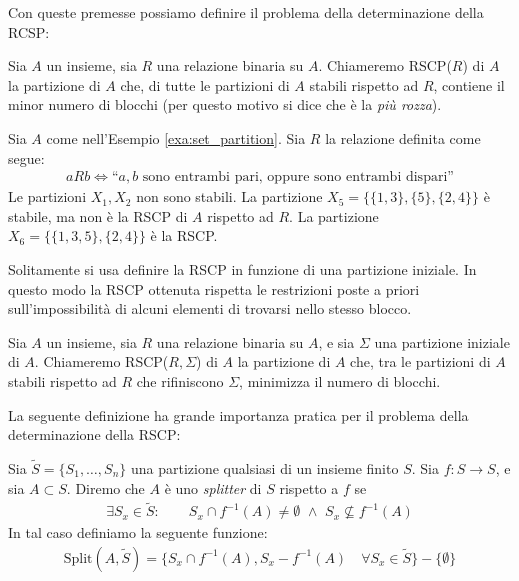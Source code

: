 Con queste premesse possiamo definire il problema della determinazione della RCSP:
\begin{definition}
    Sia $A$ un insieme, sia $R$ una relazione binaria su $A$. Chiameremo RSCP($R$) di $A$ la partizione di $A$ che, di tutte le partizioni di $A$ stabili rispetto ad $R$, contiene il minor numero di blocchi (per questo motivo si dice che è la \emph{più rozza}).
\end{definition}
\begin{example}
    Sia $A$ come nell'Esempio \ref{exa:set_partition}. Sia $R$ la relazione definita come segue:
    \begin{gather*}
        a R b \iff \text{``} a,b \text{ sono entrambi pari, oppure sono entrambi dispari''}
    \end{gather*}
    Le partizioni $X_1,X_2$ non sono stabili. La partizione $X_5 = \{\{1,3\},\{5\},\{2,4\}\}$ è stabile, ma non è la RSCP di $A$ rispetto ad $R$. La partizione
    $X_6 = \{\{1,3,5\},\{2,4\}\}$ è la RSCP.
\end{example}
Solitamente si usa definire la RSCP in funzione di una partizione iniziale. In questo modo la RSCP ottenuta rispetta le restrizioni poste a priori sull'impossibilità di alcuni elementi di trovarsi nello stesso blocco.
\begin{definition}
    Sia $A$ un insieme, sia $R$ una relazione binaria su $A$, e sia $\Sigma$ una partizione iniziale di $A$. Chiameremo RSCP($R,\Sigma$) di $A$ la partizione di $A$ che, tra le partizioni di $A$ stabili rispetto ad $R$ che rifiniscono $\Sigma$,
    minimizza il numero di blocchi.
\end{definition}
La seguente definizione ha grande importanza pratica per il problema della determinazione della RSCP:
\begin{definition}
    \label{def:funz_split}
    Sia $\widetilde{S} = \{S_1,\dots,S_n\}$ una partizione qualsiasi di un insieme finito $S$. Sia $f: S \to S$, e sia $A \subset S$. Diremo che $A$ è uno \emph{splitter} di $S$ rispetto a $f$ se
    \begin{gather*}
        \exists S_x \in \widetilde{S} : \qquad S_x \cap f^{-1}(A) \neq \emptyset \,\,\land\,\, S_x \not\subseteq f^{-1}(A)
    \end{gather*}
    In tal caso definiamo la seguente funzione:
    \begin{gather*}
        \text{Split}(A,\widetilde{S}) = \{S_x \cap f^{-1}(A), S_x - f^{-1}(A) \quad \forall S_x \in \widetilde{S}\} - \{\emptyset\}
    \end{gather*}
\end{definition}
